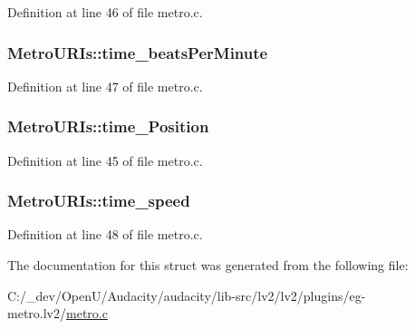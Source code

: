 Definition at line 46 of file metro.\+c.

\subsubsection[{\texorpdfstring{time\+\_\+beats\+Per\+Minute}{time_beatsPerMinute}}]{ Metro\+U\+R\+Is\+::time\+\_\+beats\+Per\+Minute}\hypertarget{struct_metro_u_r_is_adbeb8a85d53422e2e0265f2253656b34}{}\label{struct_metro_u_r_is_adbeb8a85d53422e2e0265f2253656b34}


Definition at line 47 of file metro.\+c.

\subsubsection[{\texorpdfstring{time\+\_\+\+Position}{time_Position}}]{ Metro\+U\+R\+Is\+::time\+\_\+\+Position}\hypertarget{struct_metro_u_r_is_a787befdd2e58b0f39841dfb57a5d6173}{}\label{struct_metro_u_r_is_a787befdd2e58b0f39841dfb57a5d6173}


Definition at line 45 of file metro.\+c.

\subsubsection[{\texorpdfstring{time\+\_\+speed}{time_speed}}]{ Metro\+U\+R\+Is\+::time\+\_\+speed}\hypertarget{struct_metro_u_r_is_a9c3ce1aef1da4a782887ecc8a1e2ba23}{}\label{struct_metro_u_r_is_a9c3ce1aef1da4a782887ecc8a1e2ba23}


Definition at line 48 of file metro.\+c.



The documentation for this struct was generated from the following file\+:\begin{DoxyCompactItemize}
\item 
C\+:/\+\_\+dev/\+Open\+U/\+Audacity/audacity/lib-\/src/lv2/lv2/plugins/eg-\/metro.\+lv2/\hyperlink{metro_8c}{metro.\+c}\end{DoxyCompactItemize}
